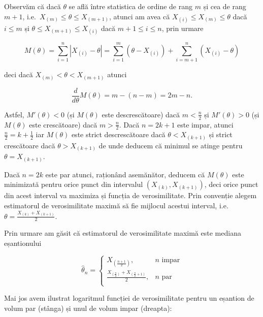 \documentclass[
]{article}
\begin{document}
Observăm că dacă \(\theta\) se află între statistica de ordine de rang
\(m\) și cea de rang \(m+1\), i.e.~\(X_{(m)}\leq \theta\leq X_{(m+1)}\),
atunci am avea că \(X_{(i)} \leq X_{(m)} \leq \theta\) dacă \(i\leq m\)
și \(\theta\leq X_{(m+1)}\leq X_{(i)}\) dacă \(m+1\leq i\leq n\), prin
urmare

\[
M(\theta) = \sum_{i=1}^{n}|X_{(i)}-\theta| = \sum_{i=1}^{m}(\theta - X_{(i)}) + \sum_{i=m+1}^{n}(X_{(i)}-\theta)
\]

deci dacă \(X_{(m)}< \theta< X_{(m+1)}\) atunci

\[
\frac{d}{d\theta}M(\theta) = m - (n-m) = 2m-n.
\]

Astfel, \(M'(\theta)<0\) (și \(M(\theta)\) este descrescătoare) dacă
\(m<\frac{n}{2}\) și \(M'(\theta)>0\) (și \(M(\theta)\) este
crescătoare) dacă \(m>\frac{n}{2}\). Dacă \(n = 2k+1\) este impar,
atunci \(\frac{n}{2} = k +\frac{1}{2}\) iar \(M(\theta)\) este strict
descrescătoare dacă \(\theta<X_{(k+1)}\) și strict crescătoare dacă
\(\theta>X_{(k+1)}\) de unde deducem că minimul se atinge pentru
\(\theta = X_{(k+1)}\).

Dacă \(n = 2k\) este par atunci, raționând asemănător, deducem că
\(M(\theta)\) este minimizată pentru orice punct din intervalul
\((X_{(k)}, X_{(k+1)})\), deci orice punct din acest interval va
maximiza și funcția de verosimilitate. Prin convenție alegem estimatorul
de verosimilitate maximă să fie mijlocul acestui interval,
i.e.~\(\theta = \frac{X_{(k)} + X_{(k+1)}}{2}\).

Prin urmare am găsit că estimatorul de verosimilitate maximă este
mediana eșantionului

\[
\hat{\theta}_n = \left\{\begin{array}{ll}
  X_{\left(\frac{n+1}{2}\right)}, & \text{$n$ impar}\\
  \frac{X_{\left(\frac{n}{2}\right)} + X_{\left(\frac{n}{2}+1\right)}}{2}, & \text{$n$ par}\\
\end{array}\right.
\]

Mai jos avem ilustrat logaritmul funcției de verosimilitate pentru un
eșantion de volum par (stânga) și unul de volum impar (dreapta):
\end{document}
